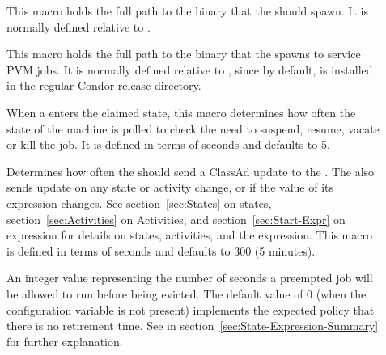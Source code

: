 \begin{description}

\item[] \label{param:Starter}  This macro holds the
  full path to the  binary that the  should 
  spawn.
  It is normally defined relative to .
  
\item[] \label{param:AlternateStarter1}
  This macro holds the full path to the 
  binary that the  spawns to service PVM jobs.  It is normally
  defined relative to , since by default,
   is installed in the regular Condor release
  directory. 
  
\item[] \label{param:PollingInterval} When a
   enters the claimed state, this macro determines how often
  the state of the machine is polled to check the need to suspend, resume,
  vacate or kill the job.  It is defined in terms of seconds and defaults to
  5.
  
\item[] \label{param:UpdateInterval}
  Determines how often the  should send a ClassAd update
  to the .  The  also sends update on any
  state or activity change, or if the value of its  expression
  changes.  See section~\ref{sec:States} on 
  states, section~\ref{sec:Activities} on 
  Activities, and section~\ref{sec:Start-Expr} on 
   expression for details on states, activities, and the
   expression.  This macro is defined in
  terms of seconds and defaults to 300 (5 minutes).
  
\item[] \label{param:MaxJobRetirementTime}
  An integer value representing the number of seconds a preempted job
  will be allowed to run before being evicted. The default value of 0
  (when the configuration variable is not present) implements the
  expected policy that there is no retirement time.  See
   in
  section~\ref{sec:State-Expression-Summary} for further explanation.


\end{description}
